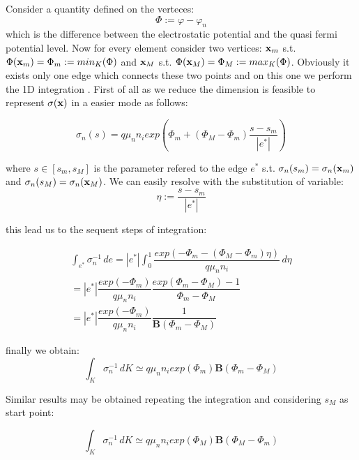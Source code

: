 Consider a quantity defined on the verteces:
\begin{equation}
\label{eq: differenza tra pot e qf}
\Phi := \varphi - 	\varphi_n
\end{equation}
which is the difference between the electrostatic potential and the quasi fermi potential level. Now for every element consider two vertices: $\mathbf{x}_m$ s.t. $\Phi(\mathbf{x}_m)=\Phi_m := min_K(\Phi)$ and $\mathbf{x}_M$ s.t. $\Phi(\mathbf{x}_M)=\Phi_M:=max_K(\Phi)$. Obviously it exists only one edge which connects these two points and on this one we perform the 1D integration . First of all as we reduce the dimension is feasible to represent $\sigma(\mathbf{x})$ in a easier mode as follows:

\begin{equation}
\sigma_n(s) = q \mu_n n_i exp\left( \Phi_m + (\Phi_M-\Phi_m)\dfrac{s-s_m}{|e^*|} \right)
\end{equation}

where $s \in [s_m,s_M]$ is the parameter refered to the edge $e^*$ s.t. $\sigma_n(s_m)=\sigma_n(\mathbf{x}_m)$ and $\sigma_n(s_M)=\sigma_n(\mathbf{x}_M)$. We can easily resolve  with the substitution of variable:
\begin{equation*}
\eta := \dfrac{s-s_m}{|e^*|}
\end{equation*}

this lead us to the sequent steps of integration:

\begin{multline*}
\int_{e^*} \sigma_n^{-1} \, de = |e^*| \int_0^1 \dfrac{exp \left(-\Phi_m - (\Phi_M-\Phi_m)\eta \right)}{q\mu_n n_i} 
 \, d\eta \\
 = |e^*|\dfrac{exp (-\Phi_m)}{q\mu_n n_i} \dfrac{exp ( \Phi_m-\Phi_M)-1}{\Phi_m-\Phi_M} \\
 =  |e^*|\dfrac{exp (-\Phi_m)}{q\mu_n n_i} \dfrac{1}{\mathbf{B}(\Phi_m-\Phi_M)}
\end{multline*}

finally we obtain:
\begin{equation}
\label{eq: finally approzimation 3D to 1D}
\int_{K} \sigma_n^{-1} \, dK \simeq  q \mu_n n_i exp(\Phi_m) \mathbf{B}(\Phi_m-\Phi_M)
\end{equation}

Similar results may be obtained repeating the integration and considering $s_M$ as start point:

\begin{equation}
\int_{K} \sigma_n^{-1} \, dK \simeq  q \mu_n n_i exp(\Phi_M) \mathbf{B}(\Phi_M-\Phi_m)
\end{equation}

